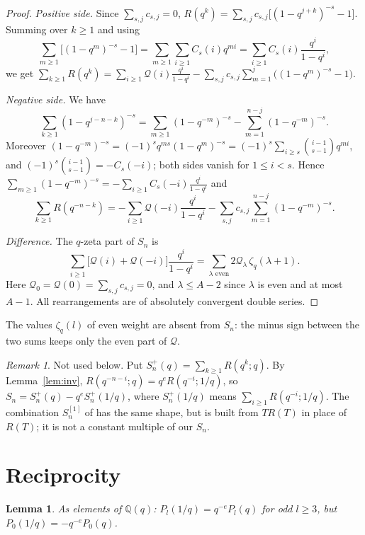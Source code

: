 \documentclass[11pt]{amsart}
\newtheorem{lemma}[theorem]{Lemma}
\theoremstyle{definition}
\theoremstyle{remark}
\newtheorem{remark}[theorem]{Remark}
\numberwithin{equation}{section}
\newcommand{\QQ}{\mathbb{Q}}
\begin{document}
\begin{proof}
\emph{Positive side.} Since $\sum_{s,j}c_{s,j}=0$, $R(q^k)=\sum_{s,j}c_{s,j}\bigl[(1-q^{j+k})^{-s}-1\bigr]$. Summing over
$k\ge1$ and using
\[
\sum_{m\ge1}\bigl[(1-q^m)^{-s}-1\bigr]=\sum_{m\ge1}\sum_{i\ge1}C_s(i)q^{mi}=\sum_{i\ge1}C_s(i)\frac{q^i}{1-q^i},
\]
we get $\sum_{k\ge1}R(q^k)=\sum_{i\ge1}\mathcal Q(i)\frac{q^i}{1-q^i}-\sum_{s,j}c_{s,j}\sum_{m=1}^j\bigl((1-q^m)^{-s}
-1\bigr)$.

\emph{Negative side.} We have
\[
\sum_{k\ge1}(1-q^{j-n-k})^{-s}=\sum_{m\ge1}(1-q^{-m})^{-s}-\sum_{m=1}^{n-j}(1-q^{-m})^{-s}.
\]
Moreover $(1-q^{-m})^{-s}=(-1)^sq^{ms}(1-q^m)^{-s}=(-1)^s\sum_{i\ge s}\binom{i-1}{s-1}q^{mi}$, and
$(-1)^s\binom{i-1}{s-1}=-C_s(-i)$; both sides vanish for $1\le i<s$. Hence
$\sum_{m\ge1}(1-q^{-m})^{-s}=-\sum_{i\ge1}C_s(-i)\frac{q^i}{1-q^i}$ and
\[
\sum_{k\ge1}R(q^{-n-k})=-\sum_{i\ge1}\mathcal Q(-i)\frac{q^i}{1-q^i}-\sum_{s,j}c_{s,j}\sum_{m=1}^{n-j}(1-q^{-m})^{-s}.
\]

\emph{Difference.} The $q$-zeta part of $S_n$ is
\[
\sum_{i\ge1}\bigl[\mathcal Q(i)+\mathcal Q(-i)\bigr]\frac{q^i}{1-q^i}=\sum_{\lambda\text{ even}}2\mathcal
Q_\lambda\,\zeta_q(\lambda+1).
\]
Here $\mathcal Q_0=\mathcal Q(0)=\sum_{s,j}c_{s,j}=0$,
and $\lambda\le A-2$ since $\lambda$ is even and at most $A-1$. All rearrangements are of absolutely convergent double
series.
\end{proof}

The values $\zeta_q(l)$ of even weight are absent from $S_n$: the minus sign between the two sums keeps only the even
part of $\mathcal Q$.

\begin{remark}
Not used below. Put $S_n^+(q)=\sum_{k\ge1}R(q^k;q)$. By Lemma~\ref{lem:inv}, $R(q^{-n-i};q)=q^eR(q^{-i};1/q)$, so
$S_n=S_n^+(q)-q^eS_n^+(1/q)$, where $S_n^+(1/q)$ means $\sum_{i\ge1}R(q^{-i};1/q)$. The combination $S_n^{[1]}$ of
\cite[\S3]{KRZ06} has the same shape, but is built from $TR(T)$ in place of $R(T)$; it is not a constant multiple of
our $S_n$.
\end{remark}

\section{Reciprocity}\label{sec:recip}

\begin{lemma}\label{lem:recip}
As elements of $\QQ(q)$: $P_l(1/q)=q^{-e}P_l(q)$ for odd $l\ge3$, but $P_0(1/q)=-q^{-e}P_0(q)$.
\end{lemma}
\end{document}
